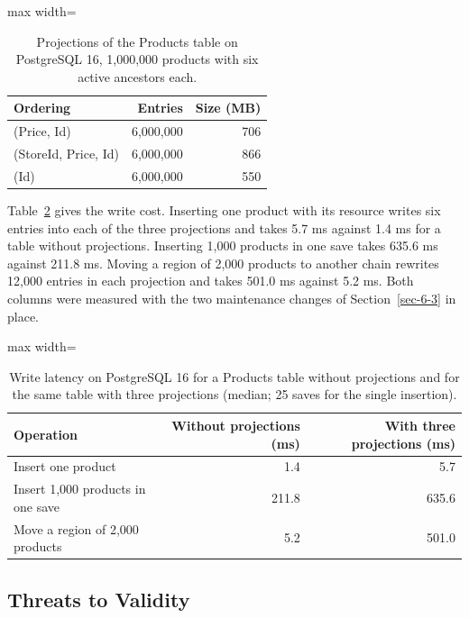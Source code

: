 \documentclass[conference]{IEEEtran}
\begin{document}
\begin{table}[!tp]
\centering
\caption{Projections of the Products table on PostgreSQL 16, 1,000,000 products with six active ancestors each.}
\label{tab:8}
\scriptsize
\begin{adjustbox}{max width=\columnwidth}
\begin{tabular}{@{}lrr@{}}
\toprule\noalign{}
Ordering & Entries & Size (MB) \\
\midrule\noalign{}
(Price, Id) & 6,000,000 & 706 \\
(StoreId, Price, Id) & 6,000,000 & 866 \\
(Id) & 6,000,000 & 550 \\
\bottomrule
\end{tabular}
\end{adjustbox}
\end{table}

Table~\ref{tab:9} gives the write cost. Inserting one product with its resource writes six entries into each of the three projections and takes 5.7 ms against 1.4 ms for a table without projections. Inserting 1,000 products in one save takes 635.6 ms against 211.8 ms. Moving a region of 2,000 products to another chain rewrites 12,000 entries in each projection and takes 501.0 ms against 5.2 ms. Both columns were measured with the two maintenance changes of Section~\ref{sec-6-3} in place.

\begin{table}[!tp]
\centering
\caption{Write latency on PostgreSQL 16 for a Products table without projections and for the same table with three projections (median; 25 saves for the single insertion).}
\label{tab:9}
\scriptsize
\begin{adjustbox}{max width=\columnwidth}
\begin{tabular}{@{}lrr@{}}
\toprule\noalign{}
Operation & Without projections (ms) & With three projections (ms) \\
\midrule\noalign{}
Insert one product & 1.4 & 5.7 \\
Insert 1,000 products in one save & 211.8 & 635.6 \\
Move a region of 2,000 products & 5.2 & 501.0 \\
\bottomrule
\end{tabular}
\end{adjustbox}
\end{table}

\subsection{Threats to Validity}\label{sec-7-8}
\end{document}
